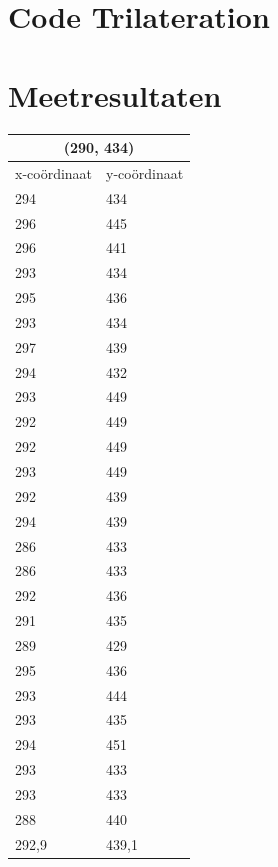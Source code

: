 \documentclass{article}
\begin{document}
\section{Code Trilateration}
    \fontsize{8pt}{8pt}\selectfont

    \fontsize{10pt}{12pt}\selectfont
\newpage

\section{Meetresultaten}
\label{Meetresultaten}
\begin{tabular}{ |l|l| }
  \hline
  \multicolumn{2}{|c|}{(290, 434)} \\
  \hline
  x-co\"ordinaat & y-co\"ordinaat \\ \hline
     294 & 434\\ \hline
     296 & 445\\ \hline
     296 & 441\\ \hline
     293 & 434\\ \hline
     295 & 436\\ \hline
     293 & 434\\ \hline
     297 & 439\\ \hline
     294 & 432\\ \hline
     293 & 449\\ \hline
     292 & 449\\ \hline
     292 & 449\\ \hline
     293 & 449\\ \hline
     292 & 439\\ \hline
     294 & 439\\ \hline
     286 & 433\\ \hline
     286 & 433\\ \hline
     292 & 436\\ \hline
     291 & 435\\ \hline
     289 & 429\\ \hline
     295 & 436\\ \hline
     293 & 444\\ \hline
     293 & 435\\ \hline
     294 & 451\\ \hline
     293 & 433\\ \hline
     293 & 433\\ \hline
     288 & 440\\ \hline\hline
     292,9 & 439,1 \\ \hline
\end{tabular}
\end{document}

